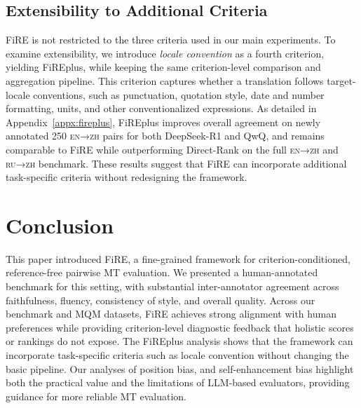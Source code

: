 \documentclass{article}
\theoremstyle{plain}
\theoremstyle{definition}
\theoremstyle{remark}
\newcommand{\enzh}{\textsc{en→zh} }
\newcommand{\ruzh}{\textsc{ru→zh} }
\begin{document}
\subsection{Extensibility to Additional Criteria}
FiRE is not restricted to the three criteria used in our main experiments. To examine extensibility, we introduce \textit{locale convention} as a fourth criterion, yielding FiREplus, while keeping the same criterion-level comparison and aggregation pipeline. This criterion captures whether a translation follows target-locale conventions, such as punctuation, quotation style, date and number formatting, units, and other conventionalized expressions. As detailed in Appendix~\ref{appx:fireplus}, FiREplus improves overall agreement on newly annotated 250 \enzh pairs for both DeepSeek-R1 and QwQ, and remains comparable to FiRE while outperforming Direct-Rank on the full \enzh and \ruzh benchmark. These results suggest that FiRE can incorporate additional task-specific criteria without redesigning the framework.





\section{Conclusion}

This paper introduced FiRE, a fine-grained framework for criterion-conditioned, reference-free pairwise MT evaluation. We presented a human-annotated benchmark for this setting, with substantial inter-annotator agreement across faithfulness, fluency, consistency of style, and overall quality. Across our benchmark and MQM datasets, FiRE achieves strong alignment with human preferences while providing criterion-level diagnostic feedback that holistic scores or rankings do not expose. The FiREplus analysis shows that the framework can incorporate task-specific criteria such as locale convention without changing the basic pipeline. Our analyses of position bias, and self-enhancement bias highlight both the practical value and the limitations of LLM-based evaluators, providing guidance for more reliable MT evaluation.
\end{document}
